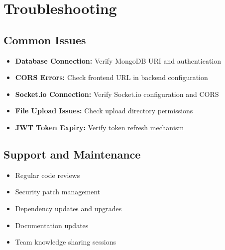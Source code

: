 \section{Troubleshooting}

\subsection{Common Issues}

\begin{itemize}
    \item \textbf{Database Connection:} Verify MongoDB URI and authentication
    \item \textbf{CORS Errors:} Check frontend URL in backend configuration
    \item \textbf{Socket.io Connection:} Verify Socket.io configuration and CORS
    \item \textbf{File Upload Issues:} Check upload directory permissions
    \item \textbf{JWT Token Expiry:} Verify token refresh mechanism
\end{itemize}

\subsection{Support and Maintenance}

\begin{itemize}
    \item Regular code reviews
    \item Security patch management
    \item Dependency updates and upgrades
    \item Documentation updates
    \item Team knowledge sharing sessions
\end{itemize}

